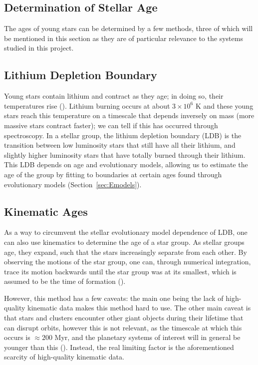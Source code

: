 \documentclass[11pt]{report}
\begin{document}
\begin{mainf}

\section{Determination of Stellar Age}\label{sec:date}
The ages of young stars can be determined by a few methods, three of which will be mentioned in this section as they are of particular relevance to the systems studied in this project.

\subsection{Lithium Depletion Boundary}
Young stars contain lithium and contract as they age; in doing so, their temperatures rise (\citealp{Soderblom2014}).
Lithium burning occurs at about $3\times 10^6$ K and these young stars reach this temperature on a timescale that depends inversely on mass (more massive stars contract faster);
we can tell if this has occurred through spectroscopy. In a stellar group, the lithium depletion boundary (LDB) is the transition between low luminosity stars that still have all their lithium, 
and slightly higher luminosity stars that have totally burned through their lithium. This LDB depends on age and evolutionary models, allowing us to estimate the age of the group by fitting to boundaries at certain ages found through evolutionary models (Section~\ref{sec:Emodels}).

\subsection{Kinematic Ages}
As a way to circumvent the stellar evolutionary model dependence of LDB, one can also use kinematics to determine the age of a star group.
As stellar groups age, they expand, such that the stars increasingly separate from each other.
By observing the motions of the star group, one can, through numerical integration, trace its motion backwards until the star group was at its smallest, which is assumed to be the time of formation (\citealp{Soderblom2014}).

However, this method has a few caveats: the main one 
being the lack of high-quality kinematic data makes this method hard to use. 
The other main caveat is that stars and clusters encounter other giant objects during their lifetime that can disrupt orbits, 
however this is not relevant, as the timescale at which this occurs is $\approx 200$ Myr, and the planetary systems of interest will in general be younger than this (\citealp{Soderblom2010}). 
Instead, the real limiting factor is the aforementioned scarcity of high-quality kinematic data.


\end{mainf}
\end{document}
